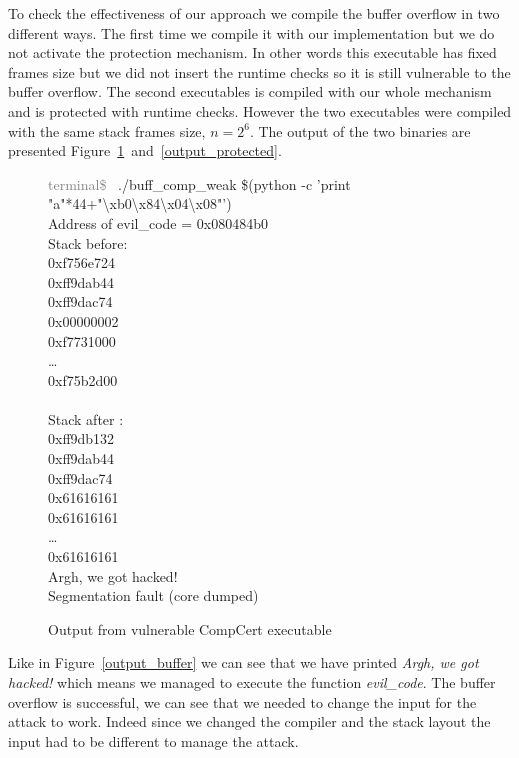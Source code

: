 \documentclass[11pt]{sdm}
\begin{document}
To check the effectiveness of our approach we compile the buffer overflow in two different ways.
The first time we compile it with our implementation but we do not activate the protection mechanism. 
In other words this executable has fixed frames size but we did not insert the runtime checks so it is still vulnerable to the buffer overflow. 
The second executables is compiled with our whole mechanism and is protected with runtime checks.
However the two executables were compiled with the same stack frames size, $n=2^6$.
The output of the two binaries are presented Figure~\ref{output_weak}~and~\ref{output_protected}. 

\begin{figure}[!ht]
\textcolor{gray}{terminal\$~} ./buff\_comp\_weak \$(python -c 'print "a"*44+"\textbackslash{xb0}\textbackslash{x84}\textbackslash{x04}\textbackslash{x08}"')\\
Address of evil\_code = 0x080484b0 \\

Stack before:\\
0xf756e724   \\
0xff9dab44   \\
0xff9dac74   \\
0x00000002   \\
0xf7731000   \\
\dots\\
0xf75b2d00   \\
             \\
Stack after :\\
0xff9db132   \\
0xff9dab44   \\
0xff9dac74   \\
0x61616161   \\
0x61616161   \\
\dots   \\
0x61616161   \\

Argh, we got hacked!\\
Segmentation fault (core dumped)
\caption{Output from vulnerable CompCert executable}
\label{output_weak}
\end{figure}

Like in Figure~\ref{output_buffer} we can see that we have printed \textit{Argh, we got hacked!} which means we managed to execute the function \textit{evil\_code}. The buffer overflow is successful, we can see that we needed to change the input for the attack to work. Indeed since we changed the compiler and the stack layout the input had to be different to manage the attack. 
\end{document}
